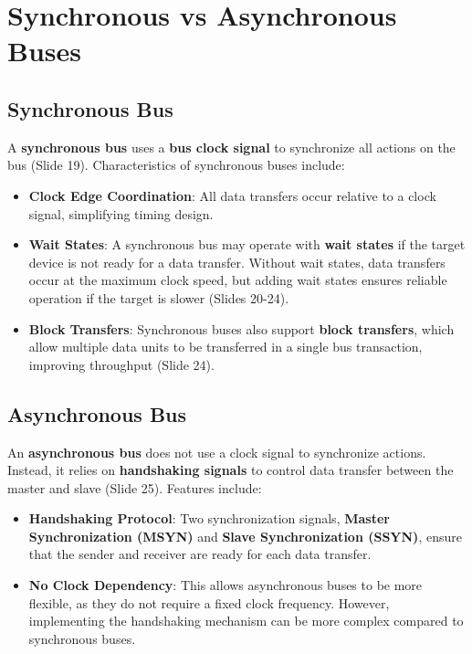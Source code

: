 \documentclass[
  14pt,
  a4paper,
  numbers=noendperiod,
  headinclude=true,
  footinclude=true,
  DIV=calc]{scrreprt}
\begin{document}
\section{Synchronous vs Asynchronous
Buses}\label{synchronous-vs-asynchronous-buses}

\subsection{Synchronous Bus}\label{synchronous-bus}

A \textbf{synchronous bus} uses a \textbf{bus clock signal} to
synchronize all actions on the bus (Slide 19). Characteristics of
synchronous buses include:

\begin{itemize}
\item
  \textbf{Clock Edge Coordination}: All data transfers occur relative to
  a clock signal, simplifying timing design.
\item
  \textbf{Wait States}: A synchronous bus may operate with \textbf{wait
  states} if the target device is not ready for a data transfer. Without
  wait states, data transfers occur at the maximum clock speed, but
  adding wait states ensures reliable operation if the target is slower
  (Slides 20-24).
\item
  \textbf{Block Transfers}: Synchronous buses also support \textbf{block
  transfers}, which allow multiple data units to be transferred in a
  single bus transaction, improving throughput (Slide 24).
\end{itemize}

\subsection{Asynchronous Bus}\label{asynchronous-bus}

An \textbf{asynchronous bus} does not use a clock signal to synchronize
actions. Instead, it relies on \textbf{handshaking signals} to control
data transfer between the master and slave (Slide 25). Features include:

\begin{itemize}
\item
  \textbf{Handshaking Protocol}: Two synchronization signals,
  \textbf{Master Synchronization (MSYN)} and \textbf{Slave
  Synchronization (SSYN)}, ensure that the sender and receiver are ready
  for each data transfer.
\item
  \textbf{No Clock Dependency}: This allows asynchronous buses to be
  more flexible, as they do not require a fixed clock frequency.
  However, implementing the handshaking mechanism can be more complex
  compared to synchronous buses.
\end{itemize}
\end{document}
